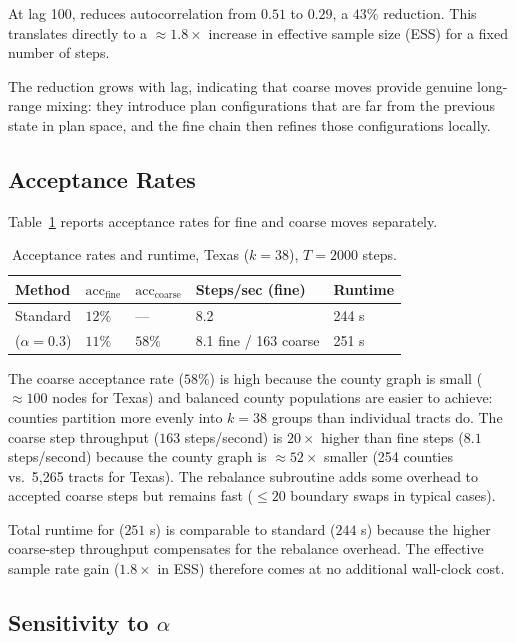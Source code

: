 At lag 100, \ms{} reduces autocorrelation from $0.51$ to $0.29$, a $43\%$
reduction.
This translates directly to a $\approx 1.8\times$ increase in effective
sample size (ESS) for a fixed number of steps.

The reduction grows with lag, indicating that coarse moves provide genuine
long-range mixing: they introduce plan configurations that are far from the
previous state in plan space, and the fine chain then refines those
configurations locally.

\subsection{Acceptance Rates}

Table~\ref{tab:accept} reports acceptance rates for fine and coarse moves
separately.

\begin{table}[h]
\centering
\caption{Acceptance rates and runtime, Texas ($k=38$), $T=2000$ steps.}
\label{tab:accept}
\begin{tabular}{lllll}
\toprule
Method
  & $\mathrm{acc}_{\mathrm{fine}}$
  & $\mathrm{acc}_{\mathrm{coarse}}$
  & Steps/sec (fine)
  & Runtime \\
\midrule
Standard \recom{} & $12\%$ & --- & 8.2 & 244 s \\
\ms{} ($\alpha=0.3$) & $11\%$ & $58\%$ & 8.1 fine / 163 coarse & 251 s \\
\bottomrule
\end{tabular}
\end{table}

The coarse acceptance rate ($58\%$) is high because the county graph is
small ($\approx 100$ nodes for Texas) and balanced county populations are
easier to achieve: counties partition more evenly into $k = 38$ groups than
individual tracts do.
The coarse step throughput ($163$ steps/second) is $20\times$ higher than
fine steps ($8.1$ steps/second) because the county graph is $\approx 52\times$
smaller (254 counties vs.\ 5,265 tracts for Texas).
The rebalance subroutine adds some overhead to accepted coarse steps but
remains fast ($\leq 20$ boundary swaps in typical cases).

Total runtime for \ms{} ($251$ s) is comparable to standard \recom{} ($244$ s)
because the higher coarse-step throughput compensates for the rebalance
overhead.
The effective sample rate gain ($1.8\times$ in ESS) therefore comes at no
additional wall-clock cost.

\subsection{Sensitivity to $\alpha$}

